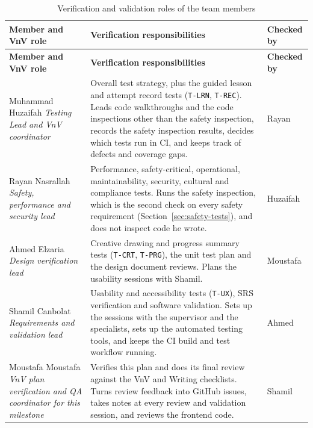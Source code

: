 \documentclass[12pt, titlepage]{article}
\begin{document}
{\small
\begin{longtable}{@{}>{\raggedright\arraybackslash}p{}
  >{\raggedright\arraybackslash}p{}
  >{\raggedright\arraybackslash}p{}@{}}
\caption{Verification and validation roles of the team members}
\label{tab:vnvTeam}\\
\toprule
\textbf{Member and VnV role} & \textbf{Verification responsibilities} &
\textbf{Checked by} \\
\midrule
\endfirsthead
\toprule
\textbf{Member and VnV role} & \textbf{Verification responsibilities} &
\textbf{Checked by} \\
\midrule
\endhead
\bottomrule
\endlastfoot
Muhammad Huzaifah \newline \emph{Testing Lead and VnV coordinator} &
Overall test strategy, plus the guided lesson and attempt record tests
(\texttt{T-LRN}, \texttt{T-REC}). Leads code walkthroughs and the code
inspections other than the safety inspection, records the safety inspection
results, decides which tests run in CI, and keeps track of defects and
coverage gaps. & Rayan \\
\addlinespace
Rayan Nasrallah \newline \emph{Safety, performance and security lead} &
Performance, safety-critical, operational, maintainability, security,
cultural and compliance tests. Runs the safety inspection, which is the second
check on every safety requirement (Section~\ref{sec:safety-tests}), and does
not inspect code he wrote. & Huzaifah \\
\addlinespace
Ahmed Elzaria \newline \emph{Design verification lead} &
Creative drawing and progress summary tests (\texttt{T-CRT},
\texttt{T-PRG}), the unit test plan and the design document reviews.
Plans the usability sessions with Shamil. & Moustafa \\
\addlinespace
Shamil Canbolat \newline \emph{Requirements and validation lead} &
Usability and accessibility tests (\texttt{T-UX}), SRS verification and
software validation. Sets up the sessions with the supervisor and the
specialists, sets up the automated testing tools, and keeps the CI build and
test workflow running. & Ahmed \\
\addlinespace
Moustafa Moustafa \newline \emph{VnV plan verification and QA coordinator for 
this milestone} &
Verifies this plan and does its final review against the VnV and Writing
checklists. Turns review feedback into GitHub issues, takes notes at
every review and validation session, and reviews the frontend code. &
Shamil \\
\end{longtable}
}
\end{document}
